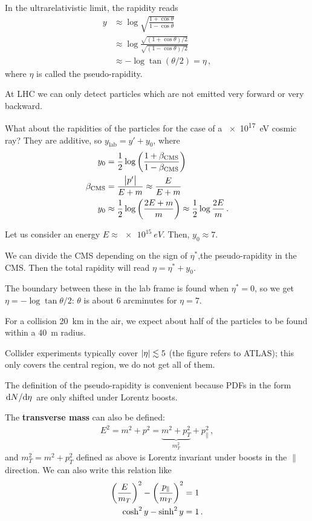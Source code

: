 \documentclass[main.tex]{subfiles}
\begin{document}
In the ultrarelativistic limit, the rapidity reads 
%
\begin{align}
y &\approx \log \sqrt{\frac{1 + \cos \theta }{1 - \cos \theta }} \\
&\approx \log \frac{\sqrt{(1 + \cos \theta ) / 2}}{\sqrt{( 1 - \cos \theta ) / 2}}  \\
&\approx - \log \tan(\theta / 2 ) = \eta 
\,,
\end{align}
%
where \(\eta \) is called the pseudo-rapidity. 


At LHC we can only detect particles which are not emitted very forward or very backward. 

What about the rapidities of the particles for the case of a \SI{e17}{eV} cosmic ray? 
They are additive, so \(y _{\text{lab}} = y' + y_0 \), where 
%
\begin{align}
y_0 &= \frac{1}{2} \log \qty(\frac{1 + \beta _{\text{CMS}}}{1 - \beta _{\text{CMS}}})  \\
\beta _{\text{CMS}} &= \frac{\abs{p'}}{E+m} \approx \frac{E}{E+m} \\
y_0 &\approx \frac{1}{2} \log \qty(\frac{2E + m}{m}) \approx \frac{1}{2} \log \frac{2E}{m} 
\,.
\end{align}

Let us consider an energy \(E \approx \SI{e15}{eV}\). Then, \(y_0 \approx 7\). 

We can divide the CMS depending on the sign of \(\eta^{*}\),the pseudo-rapidity in the CMS. Then the total rapidity will read \(\eta = \eta^{*} + y_0 \). 

The boundary between these in the lab frame is found when \(\eta^{*} = 0\), so we get \(\eta = - \log \tan \theta /2\): \(\theta \) is about 6 arcminutes for \(\eta = 7\). 

For a collision \SI{20}{km} in the air, we expect about half of the particles to be found within a \SI{40}{m} radius. 

Collider experiments typically cover \(\abs{\eta } \lesssim 5\) (the figure refers to ATLAS);
this only covers the central region, we do not get all of them. 

The definition of the pseudo-rapidity is convenient because PDFs in the form \(\dv*{N}{\eta }\) are only shifted under Lorentz boosts. 

The \textbf{transverse mass} can also be defined: 
%
\begin{align}
E^2 = m^2 + p^2 = \underbrace{m^2 + p_T^2}_{m_T^2} + p^2_\parallel
\,,
\end{align}
%
and \(m_T^2 = m^2 + p_T^2\) defined as above is Lorentz invariant under boosts in the \(\parallel\) direction. 
We can also write this relation like 
%
\begin{align}
\qty( \frac{E}{m_T})^2 - \qty( \frac{p_\parallel}{m_T})^2 &= 1  \\
\cosh^2 y - \sinh^2 y &= 1  
\,.
\end{align}
\end{document}

